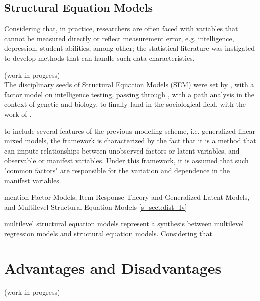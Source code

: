 \subsection{Structural Equation Models}

Considering that, in practice, researchers are often faced with variables that cannot be measured directly or reflect measurement error, e.g. intelligence, depression, student abilities, among other; the statistical literature was instigated to develop methods that can handle such data characteristics. 

{\color{red}(work in progress) \\
The disciplinary seeds of Structural Equation Models (SEM) were set by \citet{Spearman_1904}, with a factor model on intelligence testing, passing through \citet{Wright_1920}, with a path analysis in the context of genetic and biology, to finally land in the sociological field, with the work of \citet{Blalock_1961}.

to include several features of the previous modeling scheme, i.e. generalized linear mixed models, the framework is characterized by the fact that it is a method that can impute relationships between unobserved factors or latent variables, and observable or manifest variables. Under this framework, it is assumed that such "common factors" are responsible for the variation and dependence in the manifest variables.

mention Factor Models, Item Response Theory and Generalized Latent Models, and Multilevel Structural Equation Models
\ref{s_sect:dist_lv}


multilevel structural equation models represent a synthesis between multilevel regression models and structural equation models. Considering that 
}




\section{Advantages and Disadvantages}
{\color{red}(work in progress)}